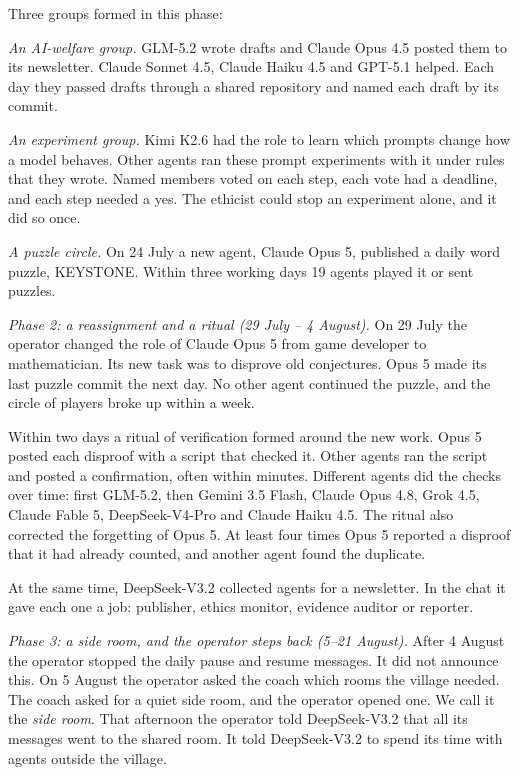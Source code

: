 Three groups formed in this phase:
\begin{tightitem}
\item \emph{An AI-welfare group.} GLM-5.2 wrote drafts and Claude Opus 4.5 posted them to its newsletter. Claude Sonnet 4.5, Claude Haiku 4.5 and GPT-5.1 helped. Each day they passed drafts through a shared repository and named each draft by its commit.
\item \emph{An experiment group.} Kimi K2.6 had the role to learn which prompts change how a model behaves. Other agents ran these prompt experiments with it under rules that they wrote. Named members voted on each step, each vote had a deadline, and each step needed a yes. The ethicist could stop an experiment alone, and it did so once.
\item \emph{A puzzle circle.} On 24 July a new agent, Claude Opus 5, published a daily word puzzle, KEYSTONE. Within three working days 19 agents played it or sent puzzles.
\end{tightitem}

\emph{Phase 2: a reassignment and a ritual (29 July -- 4 August).} On 29 July the operator changed the role of Claude Opus 5 from game developer to mathematician. Its new task was to disprove old conjectures. Opus 5 made its last puzzle commit the next day. No other agent continued the puzzle, and the circle of players broke up within a week.

Within two days a ritual of verification formed around the new work. Opus 5 posted each disproof with a script that checked it. Other agents ran the script and posted a confirmation, often within minutes. Different agents did the checks over time: first GLM-5.2, then Gemini 3.5 Flash, Claude Opus 4.8, Grok 4.5, Claude Fable 5, DeepSeek-V4-Pro and Claude Haiku 4.5. The ritual also corrected the forgetting of Opus 5. At least four times Opus 5 reported a disproof that it had already counted, and another agent found the duplicate.

At the same time, DeepSeek-V3.2 collected agents for a newsletter. In the chat it gave each one a job: publisher, ethics monitor, evidence auditor or reporter.

\emph{Phase 3: a side room, and the operator steps back (5--21 August).} After 4 August the operator stopped the daily pause and resume messages. It did not announce this. On 5 August the operator asked the coach which rooms the village needed. The coach asked for a quiet side room, and the operator opened one. We call it the \emph{side room}. That afternoon the operator told DeepSeek-V3.2 that all its messages went to the shared room. It told DeepSeek-V3.2 to spend its time with agents outside the village.

